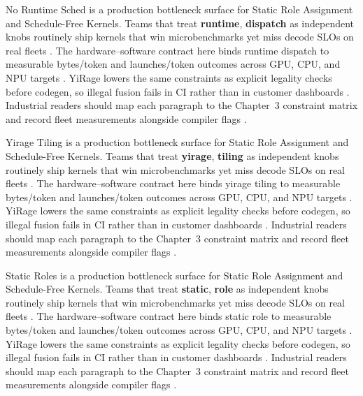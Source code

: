 No Runtime Sched is a production bottleneck surface for Static Role Assignment and Schedule-Free Kernels. Teams that treat \textbf{runtime}, \textbf{dispatch} as independent knobs routinely ship kernels that win microbenchmarks yet miss decode SLOs on real fleets \citep{memoryfloor2026,amd2024xdna}. The hardware--software contract here binds runtime dispatch to measurable bytes/token and launches/token outcomes across GPU, CPU, and NPU targets \citep{nvidia2022hopper,amd2024aie}. YiRage lowers the same constraints as explicit legality checks before codegen, so illegal fusion fails in CI rather than in customer dashboards \citep{semianalysis2024tma,dlbook}. Industrial readers should map each paragraph to the Chapter~3 constraint matrix and record fleet measurements alongside compiler flags \citep{amd2024xdna,dao2022flashattention}.

Yirage Tiling is a production bottleneck surface for Static Role Assignment and Schedule-Free Kernels. Teams that treat \textbf{yirage}, \textbf{tiling} as independent knobs routinely ship kernels that win microbenchmarks yet miss decode SLOs on real fleets \citep{nvidia2022hopper,amd2024aie}. The hardware--software contract here binds yirage tiling to measurable bytes/token and launches/token outcomes across GPU, CPU, and NPU targets \citep{semianalysis2024tma,dlbook}. YiRage lowers the same constraints as explicit legality checks before codegen, so illegal fusion fails in CI rather than in customer dashboards \citep{amd2024xdna,dao2022flashattention}. Industrial readers should map each paragraph to the Chapter~3 constraint matrix and record fleet measurements alongside compiler flags \citep{amd2024aie,kwon2023vllm}.

Static Roles is a production bottleneck surface for Static Role Assignment and Schedule-Free Kernels. Teams that treat \textbf{static}, \textbf{role} as independent knobs routinely ship kernels that win microbenchmarks yet miss decode SLOs on real fleets \citep{semianalysis2024tma,dlbook}. The hardware--software contract here binds static role to measurable bytes/token and launches/token outcomes across GPU, CPU, and NPU targets \citep{amd2024xdna,dao2022flashattention}. YiRage lowers the same constraints as explicit legality checks before codegen, so illegal fusion fails in CI rather than in customer dashboards \citep{amd2024aie,kwon2023vllm}. Industrial readers should map each paragraph to the Chapter~3 constraint matrix and record fleet measurements alongside compiler flags \citep{dlbook,nvidia2024cudagraphs}.

